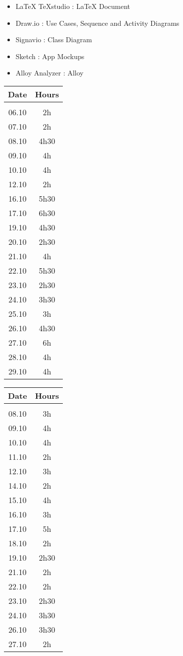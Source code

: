 \begin{itemize}
	\setlength{\leftskip}{1cm}
	\item LaTeX TeXstudio : LaTeX Document
	\item Draw.io : Use Cases, Sequence and Activity Diagrams
	\item Signavio : Class Diagram
	\item Sketch : App Mockups
	\item Alloy Analyzer : Alloy
\end{itemize}

\vspace{0.5cm}
\begin{tabular}[H]{cc}
	Date & Hours\\
	\hline\\
	06.10	&	2h\\
	07.10	&	2h\\
	08.10	&	4h30\\
	09.10	&	4h\\
	10.10	&	4h\\
	12.10	&	2h\\
	16.10	&	5h30\\
	17.10	&	6h30\\
	19.10	&	4h30\\
	20.10	&	2h30\\
	21.10	&	4h\\
	22.10	&	5h30\\
	23.10	&	2h30\\
	24.10	&	3h30\\
	25.10	&	3h\\
	26.10	&	4h30\\
	27.10	&	6h\\
	28.10	&	4h\\
	29.10	&	4h
\end{tabular}

\newpage
{}
\vspace{0.5cm}
\begin{tabular}[H]{cc}
	Date & Hours\\
	\hline\\
	08.10	&	3h\\
	09.10	&	4h\\
	10.10	&	4h\\
	11.10	&	2h\\
	12.10	&	3h\\
	14.10	&	2h\\
	15.10	&	4h\\
	16.10	&	3h\\
	17.10	&	5h\\
	18.10	&	2h\\
	19.10	&	2h30\\
	21.10	&	2h\\
	22.10	&	2h\\
	23.10	&	2h30\\
	24.10	&	3h30\\
	26.10	&	3h30\\
	27.10	&	2h
\end{tabular}

